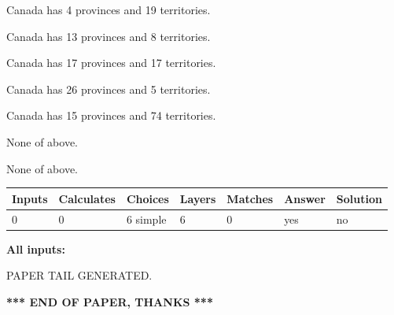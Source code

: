 \documentclass[12pt]{article}
\begin{document}
 
Canada has   4 provinces and  19 territories.
 
 
Canada has  13 provinces and  8 territories.
 
 
Canada has  17 provinces and  17 territories.
 
 
Canada has  26 provinces and  5 territories.
 
 
Canada has  15 provinces and  74 territories.
 
 
 None of above.
 
 
\noindent{}
 
 
 None of above.
 
 
\noindent{}
 
 
   
   
   
   
\noindent\begin{tabular}{|l|l|l|l|l|l|l|}
 \hline
Inputs & Calculates & Choices & Layers & Matches & Answer & Solution \\ \hline
 0  & 
 0  & 
 6
  simple  
  & 
 6  & 
 0  & 
  yes & 
  no 
  \\ \hline
 \end{tabular}
   
   
   
   
\noindent{}
   
   
   
   
\noindent\vspace{0.1in}\hspace{-0.08in} {\textbf{\Large{All inputs: }}}
   
   
   
   
   
   
 \vspace{0.2in}
 
   
   
\vspace{2.0in} PAPER TAIL GENERATED.
   
   
   
   
\vspace{1.0in} 
{\textbf{\large{ *** END OF PAPER, THANKS *** }}} 
   
\end{document}
